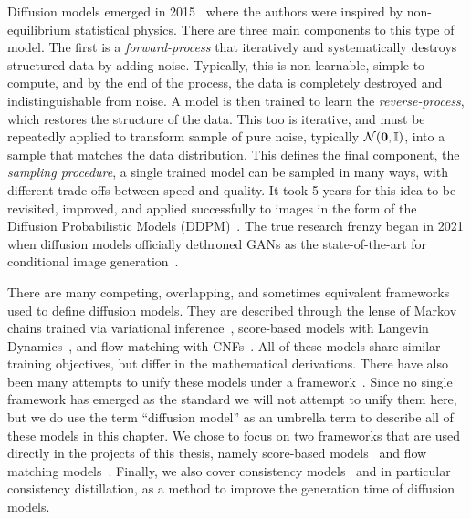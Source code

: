 Diffusion models emerged in 2015~\cite{DeepUnsupervisedLearning} where the authors were inspired by non-equilibrium statistical physics.
There are three main components to this type of model.
The first is a \textit{forward-process} that iteratively and systematically destroys structured data by adding noise.
Typically, this is non-learnable, simple to compute, and by the end of the process, the data is completely destroyed and indistinguishable from noise.
A model is then trained to learn the \textit{reverse-process}, which restores the structure of the data.
This too is iterative, and must be repeatedly applied to transform sample of pure noise, typically $\mathcal{N}(\mathbf{0}, \mathbb{I})$, into a sample that matches the data distribution.
This defines the final component, the \textit{sampling procedure}, a single trained model can be sampled in many ways, with different trade-offs between speed and quality.
It took 5 years for this idea to be revisited, improved, and applied successfully to images in the form of the Diffusion Probabilistic Models (DDPM)~\cite{DDPM}.
The true research frenzy began in 2021 when diffusion models officially dethroned GANs as the state-of-the-art for conditional image generation~\cite{DiffusionBeatsGANS}.

There are many competing, overlapping, and sometimes equivalent frameworks used to define diffusion models.
They are described through the lense of Markov chains trained via variational inference~\cite{DDPM, DDIM}, score-based models with Langevin Dynamics~\cite{ScoreBasedGenerativeModeling, ElucidatingDesignSpace}, and flow matching with CNFs~\cite{FlowStraightFast, FlowMatchingGenerative}.
All of these models share similar training objectives, but differ in the mathematical derivations.
There have also been many attempts to unify these models under a framework~\cite{CM2, ElucidatingDesignSpace,UnderstandingDiffusionModels, StochasticInterpolants, FlowStraightFast}.
Since no single framework has emerged as the standard we will not attempt to unify them here, but we do use the term ``diffusion model'' as an umbrella term to describe all of these models in this chapter.
We chose to focus on two frameworks that are used directly in the projects of this thesis, namely score-based models~\cite{ScoreBasedGenerativeModeling} and flow matching models~\cite{FlowMatchingGenerative, FlowStraightFast}.
Finally, we also cover consistency models~\cite{ConsistencyModels, CM2} and in particular consistency distillation, as a method to improve the generation time of diffusion models.

